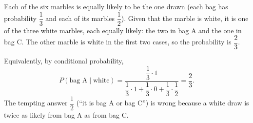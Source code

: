 Each of the six marbles is equally likely to be the one drawn (each bag has probability $\dfrac13$ and each of its marbles $\dfrac12$). Given that the marble is white, it is one of the three white marbles, each equally likely: the two in bag A and the one in bag C. The other marble is white in the first two cases, so the probability is $\boxed{\dfrac23}$.

Equivalently, by conditional probability,
\[P(\text{bag A}\mid\text{white})=\dfrac{\dfrac13\cdot1}{\dfrac13\cdot1+\dfrac13\cdot0+\dfrac13\cdot\dfrac12}=\dfrac23.\]
The tempting answer $\dfrac12$ (``it is bag A or bag C'') is wrong because a white draw is twice as likely from bag A as from bag C.
